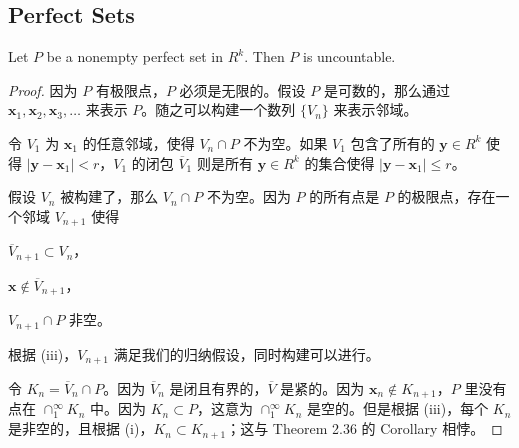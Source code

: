 \documentclass[../poma-notes.tex]{subfiles}
\begin{document}
\subsection*{Perfect Sets}

\begin{theorem}
  Let $P$ be a nonempty perfect set in $R^k$. Then $P$ is uncountable.
\end{theorem}

\begin{proof}
  因为 $P$ 有极限点，$P$ 必须是无限的。假设 $P$ 是可数的，那么通过 $\mathbf{x}_1,\mathbf{x}_2,\mathbf{x}_3,\dots$
  来表示 $P$。随之可以构建一个数列 $\{V_n\}$ 来表示邻域。

  令 $V_1$ 为 $\mathbf{x}_1$ 的任意邻域，使得 $V_n \cap P$ 不为空。如果 $V_1$ 包含了所有的 $\mathbf{y} \in R^k$ 使得
  $|\mathbf{y} - \mathbf{x}_1| < r$，$V_1$ 的闭包 $\overline{V}_1$ 则是所有 $\mathbf{y} \in R^k$ 的集合使得
  $|\mathbf{y} - \mathbf{x}_1| \le r$。

  假设 $V_n$ 被构建了，那么 $V_n \cap P$ 不为空。因为 $P$ 的所有点是 $P$ 的极限点，存在一个邻域 $V_{n+1}$ 使得
  \begin{enumerate*}[label=(\roman*)]
    \item $\overline{V}_{n+1} \subset V_n$，
    \item $\mathbf{x} \notin \overline{V}_{n+1}$，
    \item $V_{n+1} \cap P$ 非空。
  \end{enumerate*}
  根据 (iii)，$V_{n+1}$ 满足我们的归纳假设，同时构建可以进行。

  令 $K_n = \overline{V}_n \cap P$。因为 $\overline{V}_n$ 是闭且有界的，$\overline{V}$ 是紧的。因为
  $\mathbf{x}_n \notin K_{n+1}$，$P$ 里没有点在 $\cap_1^{\infty} K_n$ 中。因为 $K_n \subset P$，这意为
  $\cap_1^{\infty} K_n$ 是空的。但是根据 (iii)，每个 $K_n$ 是非空的，且根据 (i)，$K_n \subset K_{n+1}$；这与 Theorem 2.36
  的 Corollary 相悖。
\end{proof}
\end{document}
